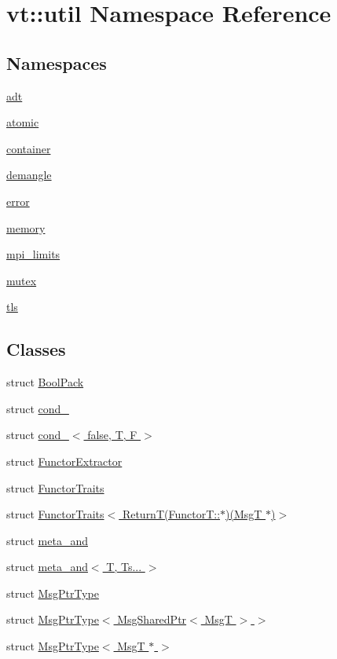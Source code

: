 \hypertarget{namespacevt_1_1util}{}\section{vt\+:\+:util Namespace Reference}
\label{namespacevt_1_1util}
\subsection*{Namespaces}
\begin{DoxyCompactItemize}
\item 
 \hyperlink{namespacevt_1_1util_1_1adt}{adt}
\item 
 \hyperlink{namespacevt_1_1util_1_1atomic}{atomic}
\item 
 \hyperlink{namespacevt_1_1util_1_1container}{container}
\item 
 \hyperlink{namespacevt_1_1util_1_1demangle}{demangle}
\item 
 \hyperlink{namespacevt_1_1util_1_1error}{error}
\item 
 \hyperlink{namespacevt_1_1util_1_1memory}{memory}
\item 
 \hyperlink{namespacevt_1_1util_1_1mpi__limits}{mpi\+\_\+limits}
\item 
 \hyperlink{namespacevt_1_1util_1_1mutex}{mutex}
\item 
 \hyperlink{namespacevt_1_1util_1_1tls}{tls}
\end{DoxyCompactItemize}
\subsection*{Classes}
\begin{DoxyCompactItemize}
\item 
struct \hyperlink{structvt_1_1util_1_1_bool_pack}{Bool\+Pack}
\item 
struct \hyperlink{structvt_1_1util_1_1cond__}{cond\+\_\+}
\item 
struct \hyperlink{structvt_1_1util_1_1cond___3_01false_00_01_t_00_01_f_01_4}{cond\+\_\+$<$ false, T, F $>$}
\item 
struct \hyperlink{structvt_1_1util_1_1_functor_extractor}{Functor\+Extractor}
\item 
struct \hyperlink{structvt_1_1util_1_1_functor_traits}{Functor\+Traits}
\item 
struct \hyperlink{structvt_1_1util_1_1_functor_traits_3_01_return_t_07_functor_t_1_1_5_08_07_msg_t_01_5_08_4}{Functor\+Traits$<$ Return\+T(\+Functor\+T\+::$\ast$)(\+Msg\+T $\ast$)$>$}
\item 
struct \hyperlink{structvt_1_1util_1_1meta__and}{meta\+\_\+and}
\item 
struct \hyperlink{structvt_1_1util_1_1meta__and_3_01_t_00_01_ts_8_8_8_01_4}{meta\+\_\+and$<$ T, Ts... $>$}
\item 
struct \hyperlink{structvt_1_1util_1_1_msg_ptr_type}{Msg\+Ptr\+Type}
\item 
struct \hyperlink{structvt_1_1util_1_1_msg_ptr_type_3_01_msg_shared_ptr_3_01_msg_t_01_4_01_4}{Msg\+Ptr\+Type$<$ Msg\+Shared\+Ptr$<$ Msg\+T $>$ $>$}
\item 
struct \hyperlink{structvt_1_1util_1_1_msg_ptr_type_3_01_msg_t_01_5_01_4}{Msg\+Ptr\+Type$<$ Msg\+T $\ast$ $>$}
\end{DoxyCompactItemize}
